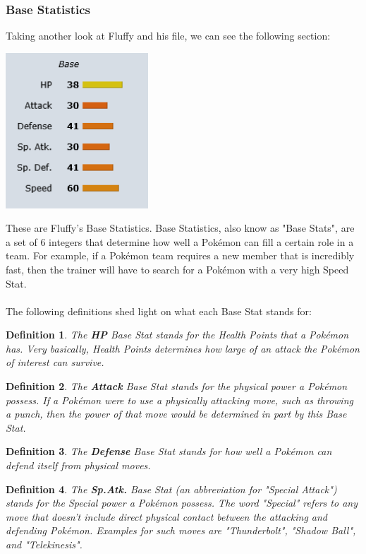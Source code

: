 \documentclass{article}
\newtheorem{definition}{Definition}
\begin{document}
\subsubsection{Base Statistics}
Taking another look at Fluffy and his file, we can see the following section:
\begin{center}
	\includegraphics[width=0.4\textwidth]{fluffystats.png}
\end{center}
These are Fluffy's Base Statistics. Base Statistics, also know as "Base Stats", are a set of 6 integers that determine how well a Pok\'emon can fill a certain role in a team. For example, if a Pok\'emon team requires a new member that is incredibly fast, then the trainer will have to search for a Pok\'emon with a very high Speed Stat. \\\\
The following definitions shed light on what each Base Stat stands for:
\begin{definition}
	The \textbf{HP} Base Stat stands for the Health Points that a Pok\'emon has. Very basically, Health Points determines how large of an attack the Pok\'emon of interest can survive.
\end{definition}
\begin{definition}
	The \textbf{Attack} Base Stat stands for the physical power a Pok\'emon possess. If a Pok\'emon were to use a physically attacking move, such as throwing a punch, then the power of that move would be determined in part by this Base Stat. 
\end{definition}
\begin{definition}
	The \textbf{Defense} Base Stat stands for how well a Pok\'emon can defend itself from physical moves. 
\end{definition}
\begin{definition}
	The \textbf{Sp.Atk.} Base Stat (an abbreviation for "Special Attack") stands for the Special power a Pok\'emon possess. The word "Special" refers to any move that doesn't include direct physical contact between the attacking and defending Pok\'emon. Examples for such moves are "Thunderbolt", "Shadow Ball", and "Telekinesis".
\end{definition}
\end{document}

